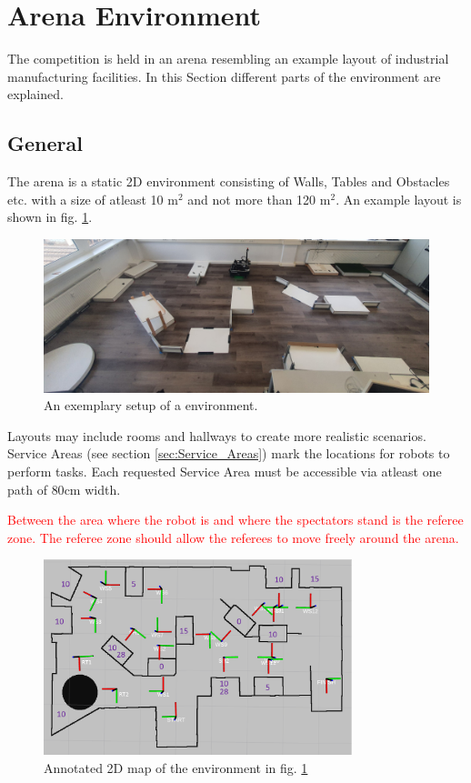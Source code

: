 \clearpage

\section{Arena Environment}
\label{sec:ArenaDesign}
The competition is held in an arena resembling an example layout of industrial manufacturing facilities. In this Section different parts of the environment are explained.
\subsection{General}
\label{ssec:ArenaGeneral}

The arena is a static 2D environment consisting of Walls, Tables and Obstacles etc. with a size of atleast 10 m$^2$ and not more than 120 m$^2$. 
An example layout is shown in fig. \ref{fig:arena_example}.

\begin{figure} [h!]
\centering
\includegraphics[width= 1\textwidth ]{./images/general_rules/arena_example.jpg}
\caption{An exemplary setup of a \RCAW environment.}
\label{fig:arena_example}
\end{figure}

Layouts may include rooms and hallways to create more realistic scenarios.
Service Areas (see section \ref{sec:Service_Areas}) mark the locations for robots to perform tasks.
Each requested Service Area must be accessible via atleast one path of $80\si{\centi\meter}$ width.

\textcolor{red}{Between the area where the robot is and where the spectators stand is the referee zone. The referee zone should allow the referees to move freely around the arena.}

\begin{figure} [h!]
\centering
\includegraphics[width= 0.8\textwidth ]{./images/general_rules/arena_map_annotated}
\caption{Annotated 2D map of the environment in fig. \ref{fig:arena_example}}
\label{fig:arena_map_annotated}
\end{figure}

